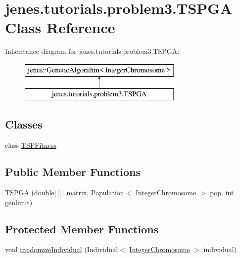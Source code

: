 \hypertarget{classjenes_1_1tutorials_1_1problem3_1_1_t_s_p_g_a}{\section{jenes.\-tutorials.\-problem3.\-T\-S\-P\-G\-A Class Reference}
\label{classjenes_1_1tutorials_1_1problem3_1_1_t_s_p_g_a}
}
Inheritance diagram for jenes.\-tutorials.\-problem3.\-T\-S\-P\-G\-A\-:\begin{figure}[H]
\begin{center}
\leavevmode
\includegraphics[height=2.000000cm]{classjenes_1_1tutorials_1_1problem3_1_1_t_s_p_g_a}
\end{center}
\end{figure}
\subsection*{Classes}
\begin{DoxyCompactItemize}
\item 
class \hyperlink{classjenes_1_1tutorials_1_1problem3_1_1_t_s_p_g_a_1_1_t_s_p_fitness}{T\-S\-P\-Fitness}
\end{DoxyCompactItemize}
\subsection*{Public Member Functions}
\begin{DoxyCompactItemize}
\item 
\hyperlink{classjenes_1_1tutorials_1_1problem3_1_1_t_s_p_g_a_aaf0ea88647e26b0bea26bcccee20085a}{T\-S\-P\-G\-A} (double\mbox{[}$\,$\mbox{]}\mbox{[}$\,$\mbox{]} \hyperlink{classjenes_1_1tutorials_1_1problem3_1_1_t_s_p_g_a_abd11fe74766fdf9d232255c6179f5f4c}{matrix}, Population$<$ \hyperlink{classjenes_1_1chromosome_1_1_integer_chromosome}{Integer\-Chromosome} $>$ pop, int genlimit)
\end{DoxyCompactItemize}
\subsection*{Protected Member Functions}
\begin{DoxyCompactItemize}
\item 
void \hyperlink{classjenes_1_1tutorials_1_1problem3_1_1_t_s_p_g_a_a50dfde1c534b9dc5f8df16d4e7512eea}{randomize\-Individual} (Individual$<$ \hyperlink{classjenes_1_1chromosome_1_1_integer_chromosome}{Integer\-Chromosome} $>$ individual)
\end{DoxyCompactItemize}
